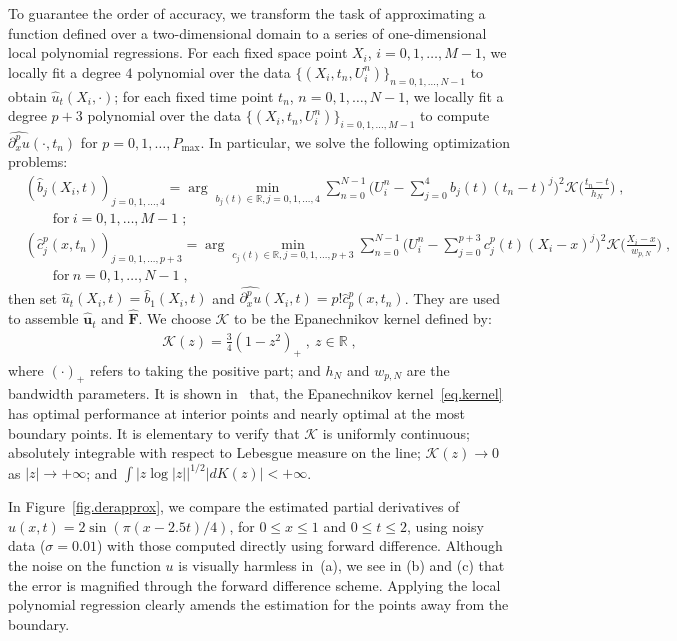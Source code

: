 \documentclass[a4paper,11pt]{article}
\newcommand{\bF}{\mathbf{F}}
\newcommand{\bu}{\mathbf{u}}
\begin{document}
To guarantee the order of accuracy, we transform the task of approximating a function defined over a two-dimensional domain to a series of one-dimensional local polynomial regressions. For each fixed space point $X_i$, $i=0,1,\dots,M-1$, we locally fit a degree $4$ polynomial over the data $\{(X_i,t_n,U_i^n)\}_{n=0,1,\dots,N-1}$ to obtain $\widehat{u}_t(X_i,\cdot)$; for each fixed time point $t_n$, $n=0,1,\dots,N-1$, we locally fit a degree $p+3$ polynomial over the data $\{(X_i,t_n,U_i^n)\}_{i=0,1,\dots,M-1}$ to compute $\widehat{\partial_x^pu}(\cdot,t_n)$ for $p=0,1,\dots,P_{\max}$. In particular, we solve the following optimization problems:
\begin{align}
&(\widehat{b}_j(X_i,t))_{j=0,1,\dots,4}=\arg\min_{b_j(t)\in\mathbb{R},j=0,1,\dots,4}\sum_{n=0}^{N-1}\big(U_i^n-\sum_{j=0}^{4}b_j(t)(t_n-t)^j\big)^2\mathcal{K}\big(\frac{t_n-t}{h_N}\big)\;,\nonumber\\
&\quad\quad\text{for}~i=0,1,\dots,M-1\;;\\
&(\widehat{c}^p_j(x,t_n))_{j=0,1,\dots,p+3}=\arg\min_{c_j(t)\in\mathbb{R},j=0,1,\dots,p+3}\sum_{n=0}^{N-1}\big(U_i^n-\sum_{j=0}^{p+3}c^p_j(t)(X_i-x)^j\big)^2\mathcal{K}\big(\frac{X_i-x}{w_{p,N}}\big)\;,\nonumber\\
&\quad\quad\text{for}~n=0,1,\dots,N-1\;,
\end{align}
then set $\widehat{u}_t(X_i,t) = \widehat{b}_1(X_i,t)$ and $\widehat{\partial_x^pu}(X_i,t) = p!\widehat{c}^p_{p}(x,t_n)$. They are used to assemble $\widehat{\bu}_t$ and $\widehat{\bF}$. We choose $\mathcal{K}$ to be the Epanechnikov kernel defined by:
\begin{align}
	\mathcal{K}(z) = \frac{3}{4}(1-z^2)_+\;,~z\in\mathbb{R}\;,\label{eq.kernel}
\end{align}
where $(\cdot)_+$ refers to taking the positive part; and $h_N$ and $w_{p,N}$ are the bandwidth parameters. It is shown in~\cite{fan1997local} that, the Epanechnikov kernel~\eqref{eq.kernel} has optimal performance at interior points and nearly optimal at the most boundary points. It is elementary to verify that $\mathcal{K}$ is uniformly continuous; absolutely integrable with respect to Lebesgue measure on the line; $\mathcal{K}(z)\to 0$ as $|z|\to+\infty$; and  $\int |z\log|z||^{1/2}|dK(z)|<+\infty$.

In Figure~\ref{fig.derapprox}, we compare the estimated partial derivatives of $u(x,t) = 2\sin(\pi(x-2.5t)/4)$, for $0\leq x\leq 1$ and $0\leq t\leq 2$, using noisy data ($\sigma=0.01$) with those computed directly using forward difference. Although the noise on the function $u$ is visually harmless in~(a), we see in (b) and (c) that the error is magnified through the forward difference scheme. Applying the local polynomial regression clearly amends the estimation for the points away from the boundary.
\end{document}
